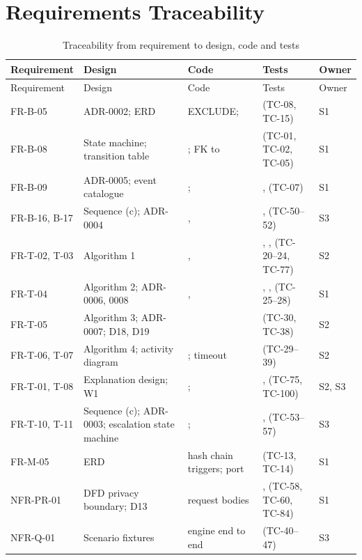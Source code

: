 \section{Requirements Traceability}\label{sec:requirements-traceability}
\begingroup\small
\begin{longtable}{@{}L{47pt}L{69pt}L{89pt}L{107pt}L{45pt}@{}}
\caption{Traceability from requirement to design, code and tests}\label{tab:traceability-from-requirement-design}\\
\toprule
Requirement & Design & Code & Tests & Owner \\
\midrule
\endfirsthead
\toprule
Requirement & Design & Code & Tests & Owner \\
\midrule
\endhead
\bottomrule
\endlastfoot
FR-B-05 & ADR-0002; ERD  &  EXCLUDE;  &  (TC-08, TC-15) & S1 \\
FR-B-08 & State machine; transition table & ; FK to  &  (TC-01, TC-02, TC-05) & S1 \\
FR-B-09 & ADR-0005; event catalogue & ;  & ,  (TC-07) & S1 \\
FR-B-16, B-17 & Sequence (c); ADR-0004 & ,  & ,  (TC-50--52) & S3 \\
FR-T-02, T-03 & Algorithm 1 & ,  & , ,  (TC-20--24, TC-77) & S2 \\
FR-T-04 & Algorithm 2; ADR-0006, 0008 & ,  & , ,  (TC-25--28) & S1 \\
FR-T-05 & Algorithm 3; ADR-0007; D18, D19 &  &  (TC-30, TC-38) & S2 \\
FR-T-06, T-07 & Algorithm 4; activity diagram & ;  timeout &  (TC-29--39) & S2 \\
FR-T-01, T-08 & Explanation design; W1 & ;  & ,  (TC-75, TC-100) & S2, S3 \\
FR-T-10, T-11 & Sequence (c); ADR-0003; escalation state machine & ;  & ,  (TC-53--57) & S3 \\
FR-M-05 & ERD  & hash chain triggers;  port &  (TC-13, TC-14) & S1 \\
NFR-PR-01 & DFD privacy boundary; D13 &  request bodies & ,  (TC-58, TC-60, TC-84) & S1 \\
NFR-Q-01 & Scenario fixtures & engine end to end &  (TC-40--47) & S3 \\
\end{longtable}
\endgroup
